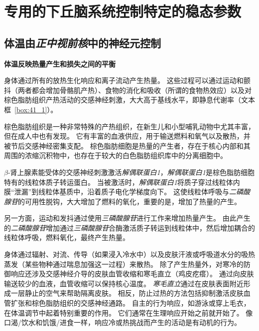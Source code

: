 \section{专用的下丘脑系统控制特定的稳态参数}

\subsection{体温由\textit{正中视前核}中的神经元控制}

\textbf{体温反映热量产生和损失之间的平衡}

身体通过所有的放热生化响应和离子流动产生热量。
这些过程可以通过运动和颤抖（两者都会增加骨骼肌产热）、食物的消化和吸收（所谓的食物热效应）以及对棕色脂肪组织产热活动的交感神经刺激，大大高于基线水平，即静息代谢率（文本框~\ref{box:41_1}）。


\begin{proposition} \label{box:41_1}
	
	\quad \quad 棕色脂肪组织是一种非常特殊的产热组织，在新生儿和小型哺乳动物中尤其丰富，但在成人中也有发现。
	它有丰富的血液供应，用于输送燃料和氧气以及散热，并被节后交感神经密集支配。
	棕色脂肪细胞是热量的产生者，存在于核心内部和其周围的浓缩沉积物中，也存在于较大的白色脂肪组织库中的分离细胞中。
	
	\quad \quad $\beta$-肾上腺素能受体的交感神经刺激激活\textit{解偶联蛋白1}，\textit{解偶联蛋白1}是棕色脂肪细胞特有的线粒体质子转运蛋白。
	当被激活时，\textit{解偶联蛋白1}将质子穿过线粒体内膜“泄漏”到线粒体基质中，沿着质子电化学梯度向下。
	这使线粒体呼吸与\textit{二磷酸腺苷}的可用性脱钩，大大增加了燃料的氧化，重要的是，增加了热量的产生。
	
	\quad \quad 另一方面，运动和发抖通过使用\textit{三磷酸腺苷}进行工作来增加热量产生。
	由此产生的\textit{二磷酸腺苷}增加通过\textit{三磷酸腺苷}合酶激活质子转运到线粒体中，然后增加耦合的线粒体呼吸，燃料氧化，最终产生热量。
	
\end{proposition}


身体通过辐射、对流、传导（如果浸入冷水中）以及皮肤汗液或呼吸道水分的吸热蒸发（某些物种通过喘息加强这一过程）来散热。
除了产生热量外，对寒冷的防御响应还涉及交感神经介导的皮肤血管收缩和寒毛直立（鸡皮疙瘩）。
通过向皮肤输送较少的血液，血管收缩可以保持核心温度。
\textit{寒毛直立}通过在皮肤表面附近形成一层静止的空气来帮助隔离皮肤。
相反，防止过热的方法包括抑制激活皮肤血管扩张和棕色脂肪组织的交感神经通路。
自主的行为响应，如游泳或穿上毛衣，在体温调节中起着特别重要的作用。
它们通常在生理响应开始之前就开始了。
像口渴/饮水和饥饿/进食一样，响应冷或热挑战而产生的活动是有动机的行为。


